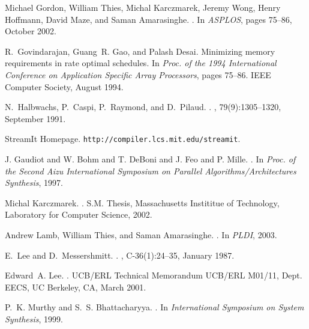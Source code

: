 \documentclass{sig-alt-full}
\begin{document}
{\begin{thebibliography}{10}
Michael Gordon, William Thies, Michal Karczmarek, Jeremy Wong, Henry Hoffmann,
  David Maze, and Saman Amarasinghe.
.
\newblock In {\em ASPLOS}, pages 75--86, October 2002.

R.~Govindarajan, Guang~R. Gao, and Palash Desai.
\newblock Minimizing memory requirements in rate optimal schedules.
\newblock In {\em Proc. of the 1994 International Conference on Application
  Specific Array Processors}, pages 75--86. IEEE Computer Society, August 1994.

N.~Halbwachs, P.~Caspi, P.~Raymond, and D.~Pilaud.
.
, 79(9):1305--1320, September 1991.

StreamIt Homepage.
\newblock \texttt{http://compiler.lcs.mit.edu/streamit}.

{J. Gaudiot and W. Bohm and T. DeBoni and J. Feo and P. Mille}.
.
\newblock In {\em Proc. of the Second Aizu International Symposium on Parallel
  Algorithms/Architectures Synthesis}, 1997.

Michal Karczmarek.
.
\newblock S.M. Thesis, Massachusetts Instititue of Technology, Laboratory for
  Computer Science, 2002.

Andrew Lamb, William Thies, and Saman Amarasinghe.
.
\newblock In {\em {PLDI}}, 2003.

E.~Lee and D.~Messershmitt.
.
, C-36(1):24--35, January 1987.

Edward~A. Lee.
.
\newblock UCB/ERL Technical Memorandum UCB/ERL M01/11, Dept. EECS, UC Berkeley,
  CA, March 2001.

P.~K. Murthy and S.~S. Bhattacharyya.
.
\newblock In {\em International Symposium on System Synthesis}, 1999.


\end{thebibliography}}
\end{document}
